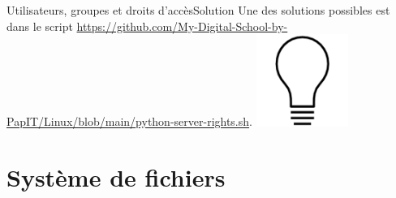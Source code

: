 \documentclass{beamer}
\begin{document}
    \begin{frame}{Utilisateurs, groupes et droits d'accès}{Solution}
        Une des solutions possibles est dans le script \url{https://github.com/My-Digital-School-by-PapIT/Linux/blob/main/python-server-rights.sh}.
        \bigbreak
        \centering
        \includegraphics[width=3cm]{image/bulb}
    \end{frame}


    \section{Système de fichiers}\label{sec:fs}
\end{document}
